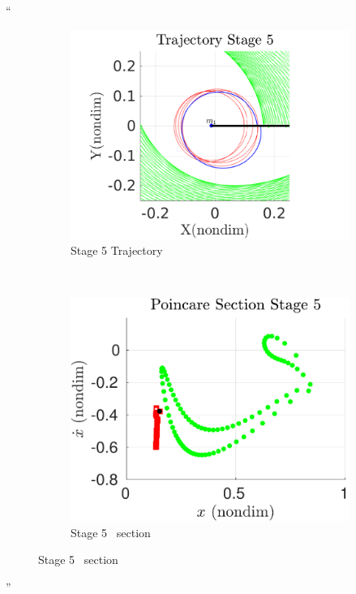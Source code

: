 \documentclass[11pt]{article}
\newenvironment{correction}{\begin{list}{}{\setlength{\leftmargin}{1cm}\setlength{\rightmargin}{1cm}}\vspace{\parsep}\item[]``}{''\end{list}}
\begin{document}
\begin{enumerate}
\begin{correction}
\begin{figure}[H]
    \centering
    \begin{subfigure}[htbp]{0.2\textwidth} 
        \includegraphics[width=\textwidth, keepaspectratio]{figures/geo_transfer/stage5_trajectory_zoom.pdf} 
        \caption{Stage 5 Trajectory~} 
    \end{subfigure}~
    \begin{subfigure}[htbp]{0.2\textwidth} 
        \includegraphics[width=\textwidth, keepaspectratio]{figures/geo_transfer/stage5_poincare.pdf} 
        \caption{Stage 5 \Poincare~section } 
    \end{subfigure}


\end{figure}
\end{correction}
\end{enumerate}
\end{document}
